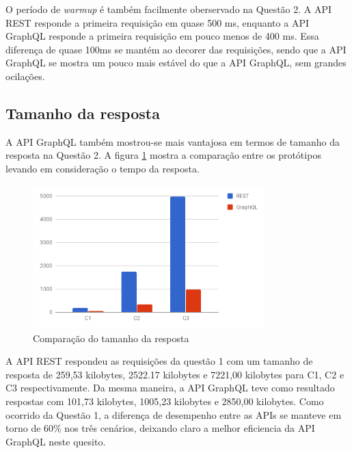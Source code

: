 O período de \textit{warmup} é também facilmente oberservado na Questão 2. A API REST responde a primeira requisição em quase 500 ms, enquanto a API GraphQL responde a primeira requisição em pouco menos de 400 ms. Essa diferença de quase 100ms se mantém ao decorer das requisições, sendo que a API GraphQL se mostra um pouco mais estável do que a API GraphQL, sem grandes ocilações.

\subsection{Tamanho da resposta}

A API GraphQL também mostrou-se mais vantajosa em termos de tamanho da resposta na Questão 2. A figura \ref{fig:q2-size} mostra a comparação entre os protótipos levando em consideração o tempo da resposta.

\begin{figure}[htbp]
    \centering
    \includegraphics[width=0.8\textwidth]{figuras/q1-size.png}
    \caption{Comparação do tamanho da resposta}
    \label{fig:q2-size}
    \author{fonte: Autor}
\end{figure}

A API REST respondeu as requisições da questão 1 com um tamanho de resposta de 259,53 kilobytes, 2522.17 kilobytes e 7221,00 kilobytes para C1, C2 e C3 respectivamente. Da mesma maneira, a API GraphQL teve como resultado respostas com 101,73 kilobytes, 1005,23 kilobytes e 2850,00 kilobytes. Como ocorrido da Questão 1, a diferença de desempenho entre as APIs se manteve em torno de 60\% nos três cenários, deixando claro a melhor eficiencia da API GraphQL neste quesito.